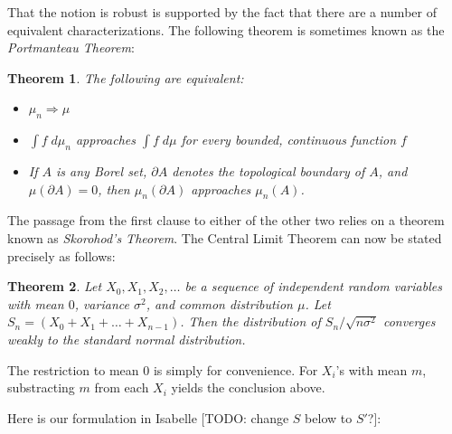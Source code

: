 \documentclass{article}
\newtheorem{theorem}{Theorem}[section]
\begin{document}
That the notion is robust is supported by the fact that there are a number of equivalent characterizations. The following theorem is sometimes known as the \emph{Portmanteau Theorem}:
\begin{theorem}
The following are equivalent:
\begin{itemize}
 \item $\mu_n \Rightarrow \mu$
 \item $\int f \; d\mu_n$ approaches $\int f \; d\mu$ for every bounded, continuous function $f$
 \item If $A$ is any Borel set, $\partial A$ denotes the topological boundary of $A$, and $\mu(\partial A) = 0$, then $\mu_n(\partial A)$ approaches $\mu_n(A)$. 
\end{itemize}
\end{theorem}
The passage from the first clause to either of the other two relies on a theorem known as \emph{Skorohod's Theorem}. The Central Limit Theorem can now be stated precisely as follows:
\begin{theorem}
Let $X_0, X_1, X_2, \ldots$ be a sequence of independent random variables with mean $0$, variance $\sigma^2$, and common distribution $\mu$. Let $S_n = (X_0 + X_1 + \ldots + X_{n-1})$. Then the distribution of $S_n / \sqrt{n \sigma^2}$ converges weakly to the standard normal distribution.
\end{theorem}
The restriction to mean $0$ is simply for convenience. For $X_i$'s with mean $m$, substracting $m$ from each $X_i$ yields the conclusion above.

Here is our formulation in Isabelle [TODO: change $S$ below to $S'$?]: %

\bigskip
\end{document}
